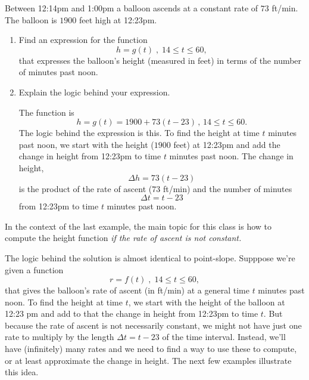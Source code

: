 \documentclass{ximera}
\begin{document}
\begin{example}  \label{Ex:IUDFr3f3fgl}
Between 12:14pm and 1:00pm a balloon ascends at a constant rate of $73$ ft/min. The balloon is $1900$ feet high at 12:23pm.

\begin{enumerate}
\item Find an expression for the function 
\[
       h=g(t)\; , \; 14\leq t \leq 60, 
\]
that expresses the balloon's height (measured in feet) in terms of the number of minutes past noon.

\item Explain the logic behind your expression.

\begin{explanation}
The function is
\[
    h = g(t) = 1900 + 73(t-23) \, , \, 14\leq t \leq 60.
\]
The logic behind the expression is this. To find the height at time $t$ minutes past noon, we start with the height ($1900$ feet) at 12:23pm and add the change in height from 12:23pm to time $t$ minutes past noon. The change in height,
\[
   \Delta h = 73(t-23)
\]
is the product of the rate of ascent ($73$ ft/min) and the number of minutes
\[
  \Delta t = t - 23
\]
from 12:23pm to time $t$ minutes past noon.
\end{explanation}
\end{enumerate}
\end{example}

In the context of the last example, the main topic for this class is how to compute the height function \emph{if the rate of ascent is not constant.}

The logic behind the solution is almost identical to point-slope. Supppose we're given a function
\[
   r =f(t) \; , \; 14\leq t \leq 60, 
\]
that gives the balloon's rate of ascent (in ft/min) at a general time $t$ minutes past noon. To find the height at time $t$, we start with the height of the balloon at 12:23 pm and add to that the change in height from 12:23pm to time $t$. But because the rate of ascent is not necessarily constant, we might not have just one rate to multiply by the length $\Delta t = t-23$ of the time interval. Instead, we'll have (infinitely) many rates and we need to find a way to use these to compute, or at least approximate the change in height. The next few examples illustrate this idea.
\end{document}
